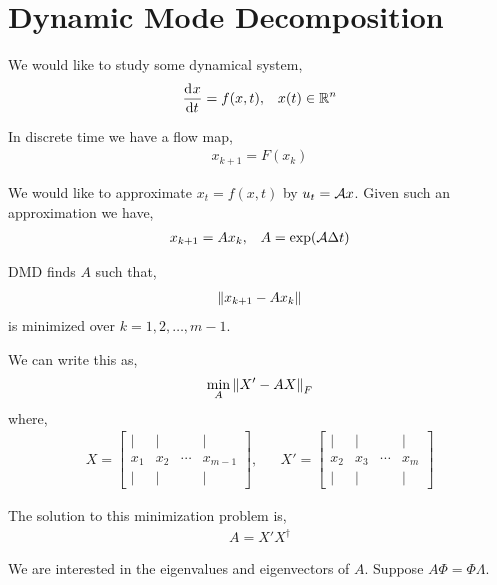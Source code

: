 \documentclass[12pt]{article}
\begin{document}

\pagebreak
\section{Dynamic Mode Decomposition}
We would like to study some dynamical system,
\begin{align*}
    \frac{\mathrm{d}^{}x}{\mathrm{d} t^{}} = f(x,t), && x(t)\in\mathbb{R}^n
\end{align*}

In discrete time we have a flow map,
\begin{align*}
    x_{k+1} = F(x_k)
\end{align*}

We would like to approximate \( x_t = f(x,t) \) by \( u_t = \mathcal{A} x \). Given such an approximation we have,
\begin{align*}
    x_{k+1} = Ax_k, && A = \exp(\mathcal{A} \Delta t)
\end{align*}


DMD finds \( A \) such that,
\begin{align*}
    \left\lVert x_{k+1} - Ax_k\right\rVert
\end{align*}
is minimized over \( k=1,2,\ldots, m-1 \).

We can write this as,
\begin{align*}
    \min_A \left\lVert X' - AX\right\rVert_F
\end{align*}
where,
\begin{align*}
    X = \left[\begin{array}{cccc}| & | & & |\\x_1 & x_2 & \cdots & x_{m-1} \\ |& | & & |\end{array}\right]
    ,&&
    X' = \left[\begin{array}{cccc}| & | & & |\\x_2 & x_3 & \cdots & x_{m} \\ |& | & & |\end{array}\right] 
\end{align*}

The solution to this minimization problem is,
\begin{align*}
    A = X' X^\dagger
\end{align*}

We are interested in the eigenvalues and eigenvectors of \( A \). Suppose \( A\Phi = \Phi \Lambda \).
\end{document}
